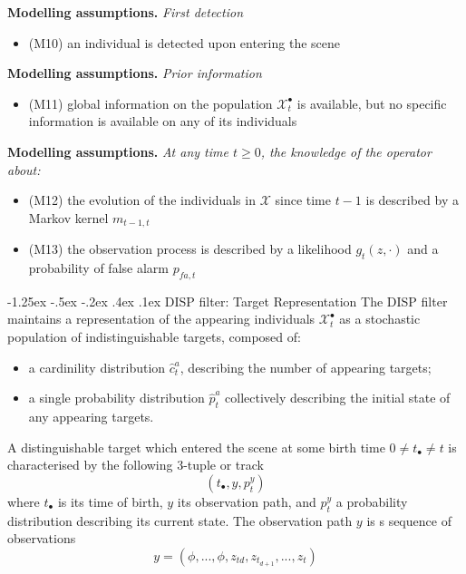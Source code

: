 \documentclass[a4paper, 11pt]{article}
\makeatletter
\newcommand{\xiaosihao}{\fontsize{12pt}{\baselineskip}\selectfont}
\renewcommand\subsection{\@startsection{subsection}{1}{\z@}%
{-1.25ex \@plus -.5ex \@minus -.2ex}%
{.4ex \@plus .1ex}%
{\normalfont\xiaosihao\CJKfamily{hei}}}
\makeatother
\begin{document}
\begin{CJK}{UTF8}{gbsn}
\textbf{Modelling assumptions.} \emph{First detection}
\begin{itemize}
  \item  (M10) an individual is detected upon entering the scene
\end{itemize}

\textbf{Modelling assumptions.} \emph{Prior information}
\begin{itemize}
  \item  (M11)  global information on the population $\mathcal{X}_t^{\bullet}$ is available, but no specific information is available on any of its individuals
\end{itemize}

\textbf{Modelling assumptions.} \emph{At any time $t \geq 0$, the knowledge of the operator about:}
\begin{itemize}
  \item  (M12) the evolution of the individuals in $\mathcal{X}$ since time $t-1$ is described by a Markov kernel $m_{t-1,t}$
  \item  (M13) the observation process is described by a likelihood $g_t(z,\cdot)$ and a probability of false alarm $p_{fa,t}$
\end{itemize}
\subsection{DISP filter: Target Representation}
The DISP filter maintains a representation of the appearing individuals  $\mathcal{X}_t^{\bullet}$ as a stochastic population of indistinguishable targets, composed of:
\begin{itemize}
  \item a cardinility distribution $\hat{c}_t^a$, describing the number of appearing targets;
  \item a single probability distribution $\hat{p}_t^a$ collectively describing the initial state of any appearing targets.
\end{itemize}

A distinguishable target which entered the scene at some birth time $0 \neq t_{\bullet} \neq t$ is characterised by the following 3-tuple or track
\[
(t_{\bullet},y,p_t^y)
\]
where $t_{\bullet}$ is its time of birth, $y$ its observation path, and $p_t^y$ a probability distribution describing its current state. The observation path $y$ is s sequence of observations
\[
y = (\phi,...,\phi,z_{td},z_{t_ {d + 1}},...,z_t)
\]


\end{CJK}
\end{document}
